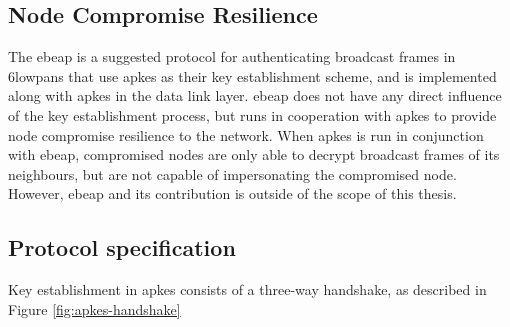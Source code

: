 \subsection{Node Compromise Resilience}

The \gls{ebeap} is a suggested protocol for authenticating broadcast frames in \gls{6lowpan}s that use \gls{apkes} as their key establishment scheme, and is implemented along with \gls{apkes} in the data link layer. \gls{ebeap} does not have any direct influence of the key establishment process, but runs in cooperation with \gls{apkes} to provide node compromise resilience to the network. When \gls{apkes} is run in conjunction with \gls{ebeap}, compromised nodes are only able to decrypt broadcast frames of its neighbours, but are not capable of impersonating the compromised node. However, \gls{ebeap} and its contribution is outside of the scope of this thesis.





\subsection{Protocol specification}
\label{subsec:apkes-spec}

Key establishment in \gls{apkes} consists of a three-way handshake, as described in Figure \ref{fig:apkes-handshake}

